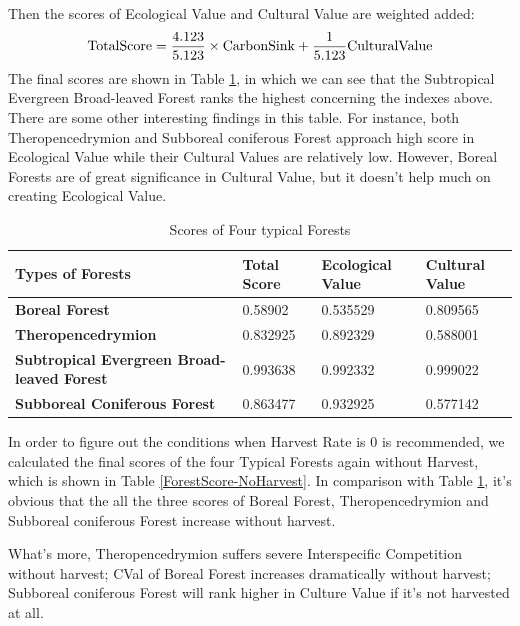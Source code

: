 \documentclass{mcmthesis}
\numberwithin{figure}{section}
\numberwithin{table}{section}
\numberwithin{equation}{section}
\begin{document}
\par
Then the scores of Ecological Value and Cultural Value are weighted added: 
$$
  \rm{TotalScore} = \frac{4.123}{5.123}\times \rm{CarbonSink} + \frac{1}{5.123}\rm{Cultural Value}
$$ 
The final scores are shown in Table \ref{ForestScore}, in which we can see that the 
Subtropical Evergreen Broad-leaved Forest ranks the highest concerning the indexes above.
There are some other interesting findings in this table. For instance, both
Theropencedrymion and Subboreal coniferous Forest approach high score in Ecological Value while 
their Cultural Values are relatively low. However, Boreal Forests are of great
significance in Cultural Value, but it doesn't help much on creating Ecological Value. 


\begin{table}[htpb!]
  \centering
  \caption{Scores of Four typical Forests} \label{ForestScore}
  \begin{tabular}{m{5.5cm}<{\centering}|m{3cm}<{\centering}|m{3cm}<{\centering}|m{3cm}<{\centering}}
  \rowcolor{lightBlue}  \textbf{Types of Forests}&\textbf{Total Score}&\textbf{Ecological Value}&\textbf{Cultural Value}\\ \hline
  \rowcolor{white} \textbf{Boreal Forest} & 0.58902 & 0.535529 & 0.809565 \\
  \rowcolor{lightBlue} \textbf{Theropencedrymion} &0.832925&0.892329&0.588001 \\
  \rowcolor{white} \textbf{Subtropical Evergreen Broad-leaved Forest} & 0.993638&0.992332 & 0.999022\\
  \rowcolor{lightBlue} \textbf{Subboreal Coniferous Forest} & 0.863477 & 0.932925 &0.577142 \\
  \end{tabular}
\end{table}

In order to figure out the conditions when Harvest Rate is 0 is recommended, 
we calculated the final scores of the four Typical Forests again without Harvest, which 
is shown in Table \ref{ForestScore-NoHarvest}. In comparison with Table \ref{ForestScore}, 
it's obvious that the all the three scores of Boreal Forest, Theropencedrymion and 
Subboreal coniferous Forest increase without harvest. 
\par
What's more, Theropencedrymion suffers severe 
Interspecific Competition without harvest; CVal of Boreal Forest increases dramatically 
without harvest; Subboreal coniferous Forest will rank higher in Culture Value if 
it's not harvested at all.
\par
\end{document}
